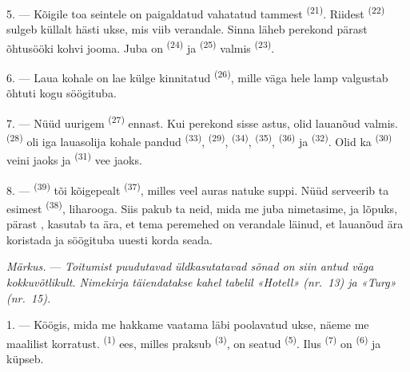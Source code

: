 \VUsaut{4.6mm}
\VUsaut{3.0mm}

5. --- Kõigile toa seintele on paigaldatud vahatatud tammest 
\textsuperscript{(21)}. Riidest  \textsuperscript{(22)} sulgeb
küllalt hästi ukse, mis viib verandale. Sinna läheb perekond pärast õhtusööki kohvi
jooma. Juba on  \textsuperscript{(24)} ja 
\textsuperscript{(25)} valmis  \textsuperscript{(23)}.

6. --- Laua kohale on lae külge kinnitatud 
\textsuperscript{(26)}, mille väga hele lamp valgustab õhtuti kogu söögituba.

7. --- Nüüd uurigem  \textsuperscript{(27)} ennast. Kui perekond
sisse astus, olid lauanõud valmis.  \textsuperscript{(28)} oli iga
lauasolija kohale pandud  \textsuperscript{(33)}, 
\textsuperscript{(29)},  \textsuperscript{(34)}, 
\textsuperscript{(35)},  \textsuperscript{(36)} ja 
\textsuperscript{(32)}. Olid ka  \textsuperscript{(30)} veini jaoks ja
 \textsuperscript{(31)} vee jaoks.

8. ---  \textsuperscript{(39)} tõi kõigepealt 
\textsuperscript{(37)}, milles veel auras natuke suppi. Nüüd serveerib ta esimest
 \textsuperscript{(38)}, liharooga. Siis pakub ta neid, mida me juba
nimetasime, ja lõpuks, pärast , kasutab ta ära, et tema
peremehed on verandale läinud, et lauanõud ära koristada ja söögituba uuesti korda
seada.

\textit{Märkus.} --- \textit{Toitumist puudutavad üldkasutatavad sõnad on siin antud
väga kokkuvõtlikult. Nimekirja täiendatakse kahel tabelil «Hotell» (nr.~13) ja
«Turg» (nr.~15).}

\VUsaut{4.6mm}
\VUsaut{3.0mm}

1. --- Köögis, mida me hakkame vaatama läbi poolavatud ukse, näeme me maalilist
korratust.  \textsuperscript{(1)} ees, milles praksub 
\textsuperscript{(3)}, on seatud  \textsuperscript{(5)}. Ilus
 \textsuperscript{(7)} on  \textsuperscript{(6)} ja
küpseb.

